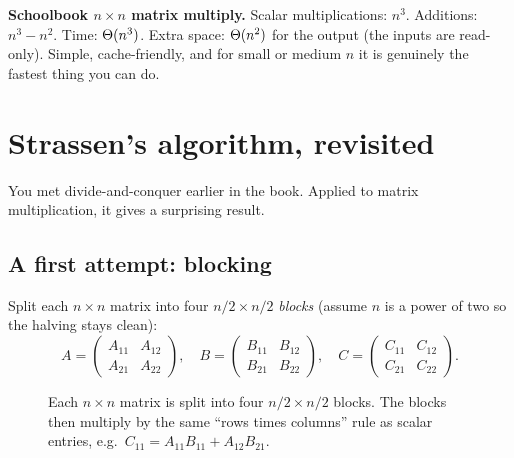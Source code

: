 \begin{complexitybox}
\textbf{Schoolbook $n\times n$ matrix multiply.}
Scalar multiplications: $n^3$. Additions: $n^3-n^2$. Time: $\Theta(n^3)$. Extra
space: $\Theta(n^2)$ for the output (the inputs are read-only). Simple,
cache-friendly, and for small or medium $n$ it is genuinely the fastest thing you can
do.
\end{complexitybox}

\section{Strassen's algorithm, revisited}

You met divide-and-conquer earlier in the book. Applied to matrix
multiplication, it gives a surprising result.

\subsection{A first attempt: blocking}

Split each $n\times n$ matrix into four $n/2\times n/2$ \emph{blocks} (assume $n$
is a power of two so the halving stays clean):
$$
A=\begin{pmatrix}A_{11} & A_{12}\\ A_{21} & A_{22}\end{pmatrix},\quad
B=\begin{pmatrix}B_{11} & B_{12}\\ B_{21} & B_{22}\end{pmatrix},\quad
C=\begin{pmatrix}C_{11} & C_{12}\\ C_{21} & C_{22}\end{pmatrix}.
$$
\begin{figure}[h]
\centering
{}
\caption{Each $n\times n$ matrix is split into four $n/2\times n/2$ blocks. The
blocks then multiply by the same ``rows times columns'' rule as scalar entries,
e.g.\ $C_{11}=A_{11}B_{11}+A_{12}B_{21}$.}
\label{ch27:blocks}
\end{figure}

